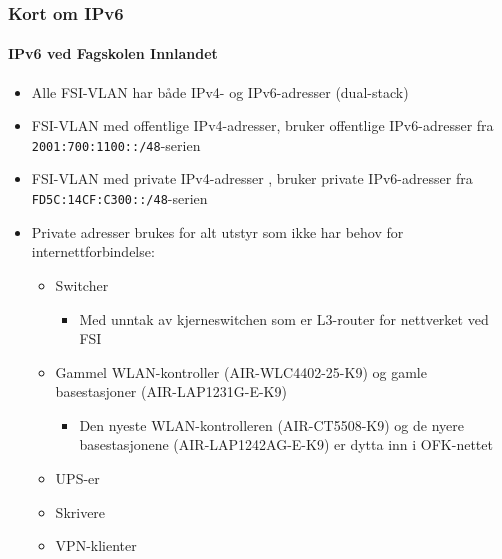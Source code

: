 \begin{frame}%
  \frametitle{Kort om IPv6}
  \framesubtitle{IPv6 ved Fagskolen Innlandet}
  \begin{itemize}[<+->]
  \item Alle FSI-VLAN har både IPv4- og IPv6-adresser (dual-stack)
  \item FSI-VLAN med offentlige IPv4-adresser, bruker offentlige
    IPv6-adresser fra \texttt{2001:700:1100::/48}-serien
  \item FSI-VLAN med private IPv4-adresser , bruker private
    IPv6-adresser fra \texttt{FD5C:14CF:C300::/48}-serien
  \item Private adresser brukes for alt utstyr som ikke har behov for
    internettforbindelse:
    \begin{itemize}[<+->]
    \item Switcher
      \begin{itemize}[<+->]
      \item Med unntak av kjerneswitchen som er L3-router for
        nettverket ved FSI
      \end{itemize}
    \item Gammel WLAN-kontroller (AIR-WLC4402-25-K9) og gamle
      basestasjoner (AIR-LAP1231G-E-K9)
      \begin{itemize}[<+->]
      \item Den nyeste WLAN-kontrolleren (AIR-CT5508-K9) og de nyere
        basestasjonene (AIR-LAP1242AG-E-K9) er dytta inn i OFK-nettet
      \end{itemize}
    \item UPS-er
    \item Skrivere
    \item VPN-klienter
    \end{itemize}
  \end{itemize}
\end{frame}

